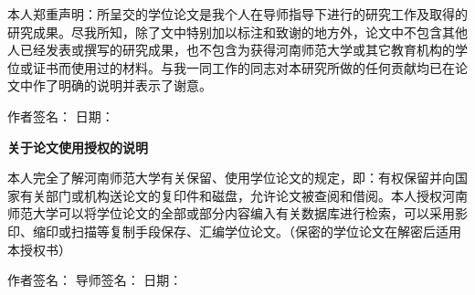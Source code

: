 \begin{DeclareOriginal}
本人郑重声明：所呈交的学位论文是我个人在导师指导下进行的研究工作及取得的研究成果。尽我所知，除了文中特别加以标注和致谢的地方外，论文中不包含其他人已经发表或撰写的研究成果，也不包含为获得河南师范大学或其它教育机构的学位或证书而使用过的材料。与我一同工作的同志对本研究所做的任何贡献均已在论文中作了明确的说明并表示了谢意。


\vspace{20pt}\hfill 作者签名：\underline{\hspace{6em}}\hspace{2em} 日期：\underline{\hspace{6em}}\vspace{220pt}

\hfill   {\textbf{关于论文使用授权的说明}}\hspace{10em} \vspace{20pt}

本人完全了解河南师范大学有关保留、使用学位论文的规定，即：有权保留并向国家有关部门或机构送论文的复印件和磁盘，允许论文被查阅和借阅。本人授权河南师范大学可以将学位论文的全部或部分内容编入有关数据库进行检索，可以采用影印、缩印或扫描等复制手段保存、汇编学位论文。（保密的学位论文在解密后适用本授权书）
		
\vspace{20pt}\hfill 作者签名：\underline{\hspace{6em}}	\hfill 导师签名：\underline{\hspace{6em}}	\hfill 日期：\underline{\hspace{6em}}		

\end{DeclareOriginal}

